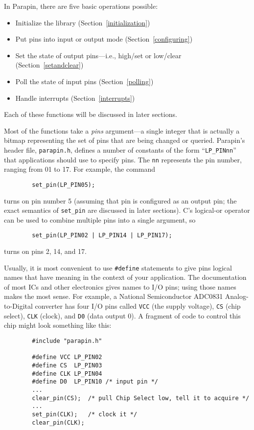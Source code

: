 \documentclass{article}
\begin{document}
In Parapin, there are five basic operations possible:

\begin{itemize}
\item Initialize the library (Section~\ref{initialization})
\item Put pins into input or output mode (Section~\ref{configuring})
\item Set the state of output pins---i.e., high/set or low/clear
(Section~\ref{setandclear})
\item Poll the state of input pins (Section~\ref{polling})
\item Handle interrupts (Section~\ref{interrupts})
\end{itemize}

Each of these functions will be discussed in later sections.

Most of the functions take a {\em pins} argument---a single integer
that is actually a bitmap representing the set of pins that are being
changed or queried.  Parapin's header file, {\tt parapin.h}, defines a
number of constants of the form ``{\tt LP\_PINnn}'' that applications
should use to specify pins.  The {\tt nn} represents the pin number,
ranging from 01 to 17.  For example, the command
\begin{verbatim}
        set_pin(LP_PIN05);
\end{verbatim}
turns on pin number 5 (assuming that pin is configured as an output
pin; the exact semantics of {\tt set\_pin} are discussed in later
sections).  C's logical-or operator can be used to combine
multiple pins into a single argument, so
\begin{verbatim}
        set_pin(LP_PIN02 | LP_PIN14 | LP_PIN17);
\end{verbatim}
turns on pins 2, 14, and 17.

Usually, it is most convenient to use {\tt \#define} statements to
give pins logical names that have meaning in the context of your
application.  The documentation of most ICs and other electronics
gives names to I/O pins; using those names makes the most sense.  For
example, a National Semiconductor ADC0831 Analog-to-Digital converter
has four I/O pins called {\tt VCC} (the supply voltage), {\tt CS}
(chip select), {\tt CLK} (clock), and {\tt D0} (data output 0).  A
fragment of code to control this chip might look something like this:
\begin{verbatim}
        #include "parapin.h"

        #define VCC LP_PIN02
        #define CS  LP_PIN03
        #define CLK LP_PIN04
        #define D0  LP_PIN10 /* input pin */
        ...
        clear_pin(CS);  /* pull Chip Select low, tell it to acquire */
        ...
        set_pin(CLK);   /* clock it */
        clear_pin(CLK);
\end{verbatim}
\end{document}
